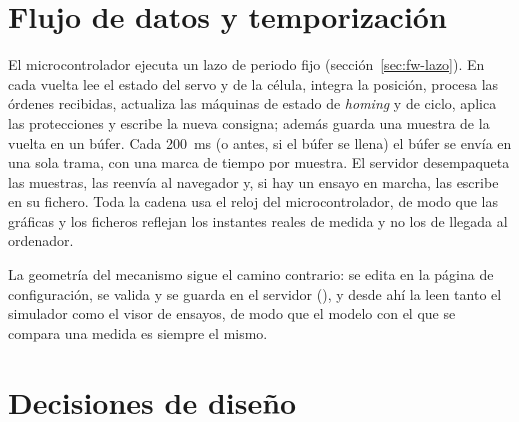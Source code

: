 \section{Flujo de datos y temporización}

El microcontrolador ejecuta un lazo de periodo fijo (sección~\ref{sec:fw-lazo}). En cada vuelta lee
el estado del servo y de la célula, integra la posición, procesa las órdenes recibidas, actualiza
las máquinas de estado de \emph{homing} y de ciclo, aplica las protecciones y escribe la nueva
consigna; además guarda una muestra de la vuelta en un búfer. Cada \SI{200}{\milli\second} (o antes,
si el búfer se llena) el búfer se envía en una sola trama, con una marca de tiempo por muestra. El
servidor desempaqueta las muestras, las reenvía al navegador y, si hay un ensayo en marcha, las
escribe en su fichero. Toda la cadena usa el reloj del microcontrolador, de modo que las gráficas y
los ficheros reflejan los instantes reales de medida y no los de llegada al ordenador.

La geometría del mecanismo sigue el camino contrario: se edita en la página de configuración, se
valida y se guarda en el servidor (), y desde ahí la leen tanto el simulador
como el visor de ensayos, de modo que el modelo con el que se compara una medida es siempre el
mismo.

\section{Decisiones de diseño}

